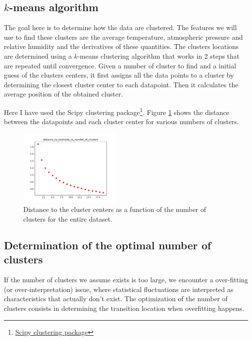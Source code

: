 \documentclass[11pt]{amsart}
\begin{document}
\subsection{$k$-means algorithm}
The goal here is to determine how the data are clustered.
The features we will use to find these clusters are the average temperature, atmospheric pressure and relative humidity and the derivatives of these quantities.
The clusters locations are determined using a $k$-means clustering algorithm that works in 2 steps that are repeated until convergence.
Given a number of cluster to find and a initial guess of the clusters centers, it first assigns all the data points to a cluster by determining the closest cluster center to each datapoint.
Then it calculates the average position of the obtained cluster.

Here I have used the Scipy clustering package\footnote{\href{https://docs.scipy.org/doc/scipy/reference/cluster.vq.html}{Scipy clustering package}}.
Figure \ref{fig:distance_to_centroids} shows the distance between the datapoints and each cluster center for various numbers of clusters. 
\begin{figure}
    \includegraphics[width=0.45\textwidth]{../plots/distance_to_centroids_vs_number_of_clusters.pdf}
    \caption{\label{fig:distance_to_centroids} Distance to the cluster centers as a function of the number of clusters for the entire dataset.}
\end{figure}

\subsection{Determination of the optimal number of clusters} 

If the number of clusters we assume exists is too large, we encounter a over-fitting (or over-interpretation) issue, where statistical fluctuations are interpreted as characteristics that actually don't exist.
The optimization of the number of clusters consists in determining the transition location when overfitting happens.
\end{document}
